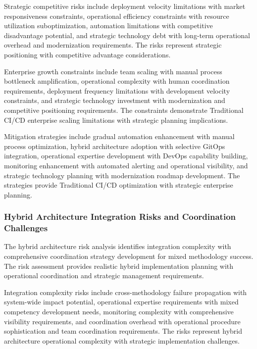 Strategic competitive risks include deployment velocity limitations with market responsiveness constraints, operational efficiency constraints with resource utilization suboptimization, automation limitations with competitive disadvantage potential, and strategic technology debt with long-term operational overhead and modernization requirements. The risks represent strategic positioning with competitive advantage considerations.

Enterprise growth constraints include team scaling with manual process bottleneck amplification, operational complexity with human coordination requirements, deployment frequency limitations with development velocity constraints, and strategic technology investment with modernization and competitive positioning requirements. The constraints demonstrate Traditional CI/CD enterprise scaling limitations with strategic planning implications.

Mitigation strategies include gradual automation enhancement with manual process optimization, hybrid architecture adoption with selective GitOps integration, operational expertise development with DevOps capability building, monitoring enhancement with automated alerting and operational visibility, and strategic technology planning with modernization roadmap development. The strategies provide Traditional CI/CD optimization with strategic enterprise planning.


\subsubsection{Hybrid Architecture Integration Risks and Coordination Challenges}

The hybrid architecture risk analysis identifies integration complexity with comprehensive coordination strategy development for mixed methodology success. The risk assessment provides realistic hybrid implementation planning with operational coordination and strategic management requirements.

Integration complexity risks include cross-methodology failure propagation with system-wide impact potential, operational expertise requirements with mixed competency development needs, monitoring complexity with comprehensive visibility requirements, and coordination overhead with operational procedure sophistication and team coordination requirements. The risks represent hybrid architecture operational complexity with strategic implementation challenges.

